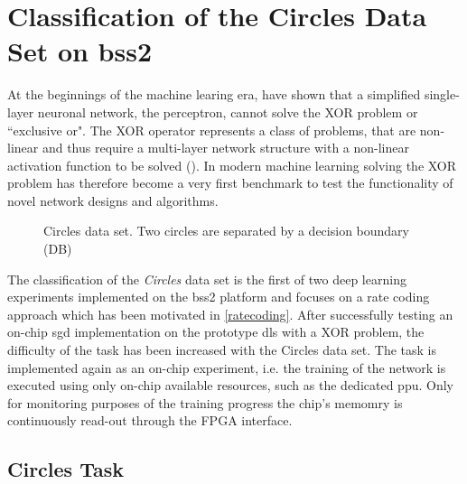 \chapter{Classification of the Circles Data Set on \acrshort{bss2}}
\label{circles}
At the beginnings of the machine learing era, \cite{perceptron} have shown that a simplified single-layer neuronal network, the perceptron, cannot solve the XOR problem or ``exclusive or". The XOR operator represents a class of problems, that are non-linear and thus require a multi-layer network structure with a non-linear activation function to be solved (\citealp{Goodfellow-et-al-2016}). In modern machine learning solving the XOR problem has therefore become a very first benchmark to test the functionality of novel network designs and algorithms.

\begin{wrapfigure}{R}{0.33\textwidth}
	\centering
	
	\caption[Circles data set.]{Circles data set. Two circles are separated by a decision boundary (DB)} 
	\label{circlestasksketch}
\end{wrapfigure}
The classification of the \emph{Circles} data set is the first of two deep learning experiments implemented on the \gls{bss2} platform and focuses on a rate coding approach which has been motivated in \cref{ratecoding}. After successfully testing an on-chip \acrlong{sgd} implementation on the prototype \gls{dls} with a XOR problem, the difficulty of the task has been increased with the Circles data set. The task is implemented again as an on-chip experiment, i.e. the training of the network is executed using only on-chip available resources, such as the dedicated \acrlong{ppu}. Only for monitoring purposes of the training progress the chip's memomry is continuously read-out through the FPGA interface.





\section{Circles Task}
\label{circlestask}

